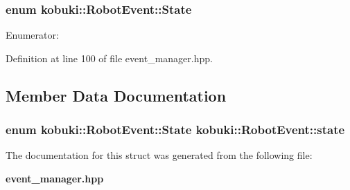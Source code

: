 \subsubsection[{\-State}]{\setlength{\rightskip}{0pt plus 5cm}enum {\bf kobuki\-::\-Robot\-Event\-::\-State}}\label{structkobuki_1_1RobotEvent_aa2da423ca872390312344a020400ec06}
\begin{Desc}
\item[\-Enumerator\-: ]\par
\begin{description}
\item[{\em 
\-Offline\label{structkobuki_1_1RobotEvent_aa2da423ca872390312344a020400ec06a2d7440133b8c35765d5775aa7b533cf4}
}]\item[{\em 
\-Online\label{structkobuki_1_1RobotEvent_aa2da423ca872390312344a020400ec06a5a4f31c47a458725cd579a8096863318}
}]\item[{\em 
\-Unknown\label{structkobuki_1_1RobotEvent_aa2da423ca872390312344a020400ec06a106f74dcd5800d5ea7f5113505aa63bc}
}]\end{description}
\end{Desc}



\-Definition at line 100 of file event\-\_\-manager.\-hpp.



\subsection{\-Member \-Data \-Documentation}
\subsubsection[{state}]{\setlength{\rightskip}{0pt plus 5cm}enum {\bf kobuki\-::\-Robot\-Event\-::\-State}  {\bf kobuki\-::\-Robot\-Event\-::state}}\label{structkobuki_1_1RobotEvent_ac9f74ad86313b2ecf97ea3fa17c1a474}


\-The documentation for this struct was generated from the following file\-:\begin{DoxyCompactItemize}
\item 
{\bf event\-\_\-manager.\-hpp}\end{DoxyCompactItemize}
